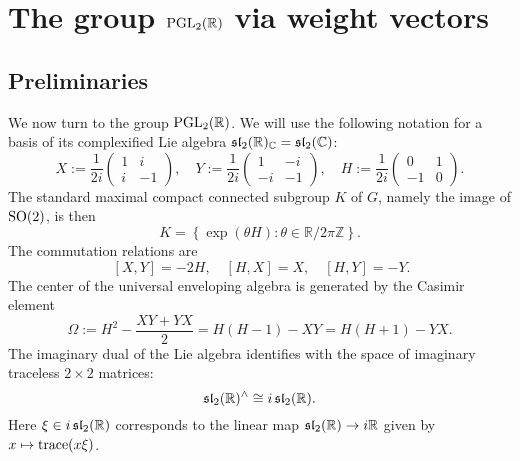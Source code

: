 \documentclass[reqno]{amsart} 
\numberwithin{equation}{section}
\begin{document}
\section{The group $\operatorname{PGL}_2(\mathbb{R})$ via weight vectors}\label{sec:d1a9162eb3c7}
\subsection{Preliminaries}\label{sec:d1a915ba8ec6}
We now turn to the group $\operatorname{PGL}_2(\mathbb{R})$.  We will use the following notation for a basis of its complexified Lie algebra $\mathfrak{sl}_2(\mathbb{R})_{\mathbb{C}} = \operatorname{\mathfrak{s}\mathfrak{l}}_2(\mathbb{C})$:
\begin{equation*}
  X := \frac{1}{2 i}
  \begin{pmatrix}
    1 & i  \\
    i & -1
  \end{pmatrix}, \quad Y := \frac{1}{2 i}
  \begin{pmatrix}
    1  & -i \\
    -i & -1
  \end{pmatrix}, \quad H := \frac{1}{2 i}
  \begin{pmatrix}
    0  & 1 \\
    -1 & 0
  \end{pmatrix}.
\end{equation*}
The standard maximal compact connected subgroup $K$ of $G$, namely the image of $\operatorname{SO}(2)$, is then
\begin{equation*}
  K = \left\{ \exp(\theta H) : \theta \in \mathbb{R} / 2 \pi \mathbb{Z}  \right\}.
\end{equation*}
The commutation relations are
\begin{equation*}
  ~
  [X,Y] = - 2 H,  \quad
  [H,X] = X,
  \quad
  [H,Y] = -Y.
\end{equation*}
The center of the universal enveloping algebra is generated by the Casimir element
\begin{equation*}
  \Omega := H^2 - \frac{X Y + Y X}{2} = H(H-1) - X Y = H(H+1) - Y X.
\end{equation*}
The imaginary dual of the Lie algebra identifies with the space of imaginary traceless $2 \times 2$ matrices:
\begin{equation}\label{eqn:d1a9150ab652}
\operatorname{\mathfrak{s}\mathfrak{l}}_2(\mathbb{R})^\wedge \cong i \operatorname{\mathfrak{s}\mathfrak{l}}_2(\mathbb{R}).
\end{equation}
Here $\xi \in i \operatorname{\mathfrak{s}\mathfrak{l}}_2(\mathbb{R})$ corresponds to the linear map $\operatorname{\mathfrak{s}\mathfrak{l}}_2(\mathbb{R}) \rightarrow i \mathbb{R} $ given by $x \mapsto \operatorname{trace}(x \xi)$.
\end{document}
